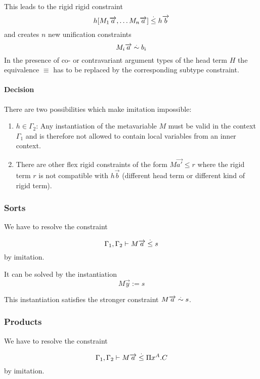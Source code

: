 This leads to the rigid rigid constraint
$$
    h [M_1 {\overrightarrow {a}}, \ldots M_n {\overrightarrow {a}}] \stackrel . \le h {\overrightarrow {b}}
$$
and creates $n$ new unification constraints
$$
    M_ i {\overrightarrow {a}} \stackrel . \sim b_i
$$
In the presence of co- or contravariant argument types of the head term $H$ the
equivalence $\equiv$ has to be replaced by the corresponding subtype constraint.

\paragraph{Decision} There are two possibilities which make imitation impossible:
\begin{enumerate}
    \item $h \in \Gamma_2$: Any instantiation of the metavariable $M$ must be
        valid in the context $\Gamma_1$ and is therefore not allowed to contain
        local variables from an inner context.

    \item There are other flex rigid constraints of the form $M \vec {a'} \le r$
        where the rigid term $r$ is not compatible with $h \vec b$ (different
        head term or different kind of rigid term).
\end{enumerate}







\subsubsection {Sorts}


We have to resolve the constraint

$$
    \Gamma_1, \Gamma_2
    \vdash
    M {\overrightarrow {a}} \stackrel . \le s
$$
by imitation.

It can be solved by the instantiation
$$
    M \vec y := s
$$

This instantiation satisfies the stronger constraint $M {\overrightarrow {a}} \stackrel . \sim s$.




\subsubsection {Products}




We have to resolve the constraint

$$
    \Gamma_1, \Gamma_2
    \vdash
    M {\overrightarrow {a}} \stackrel . \le \Pi x^A. C
$$
by imitation.

